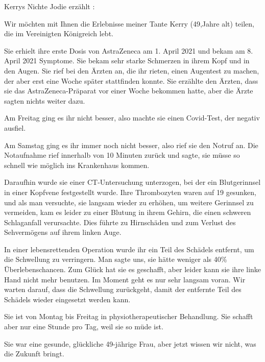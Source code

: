 Kerrys Nichte Jodie erzählt :

Wir möchten mit Ihnen die Erlebnisse meiner Tante Kerry (49,Jahre alt) teilen,
die im Vereinigten Königreich lebt.

Sie erhielt ihre erste Dosis von AstraZeneca am 1. April 2021 und bekam am
8. April 2021 Symptome. Sie bekam sehr starke Schmerzen in ihrem Kopf und in den
Augen. Sie rief bei den Ärzten an, die ihr rieten, einen Augentest zu machen,
der aber erst eine Woche später stattfinden konnte. Sie erzählte den Ärzten,
dass sie das AstraZeneca-Präparat vor einer Woche bekommen hatte, aber die Ärzte
sagten nichts weiter dazu.

Am Freitag ging es ihr nicht besser, also machte sie einen Covid-Test, der
negativ ausfiel.

Am Samstag ging es ihr immer noch nicht besser, also rief sie den Notruf an. Die
Notaufnahme rief innerhalb von 10 Minuten zurück und sagte, sie müsse so schnell
wie möglich ins Krankenhaus kommen.

Daraufhin wurde sie einer CT-Untersuchung unterzogen, bei der ein Blutgerinnsel
in einer Kopfvene festgestellt wurde. Ihre Thrombozyten waren auf 19 gesunken,
und als man versuchte, sie langsam wieder zu erhöhen, um weitere Gerinnsel zu
vermeiden, kam es leider zu einer Blutung in ihrem Gehirn, die einen schweren
Schlaganfall verursachte. Dies führte zu Hirnschäden und zum Verlust des
Sehvermögens auf ihrem linken Auge.

In einer lebensrettenden Operation wurde ihr ein Teil des Schädels entfernt, um
die Schwellung zu verringern. Man sagte uns, sie hätte weniger als 40\%
Überlebenschancen. Zum Glück hat sie es geschafft, aber leider kann sie ihre
linke Hand nicht mehr benutzen. Im Moment geht es nur sehr langsam voran. Wir
warten darauf, dass die Schwellung zurückgeht, damit der entfernte Teil des
Schädels wieder eingesetzt werden kann.

Sie ist von Montag bis Freitag in physiotherapeutischer Behandlung. Sie schafft
aber nur eine Stunde pro Tag, weil sie so müde ist.

Sie war eine gesunde, glückliche 49-jährige Frau, aber jetzt wissen wir nicht,
was die Zukunft bringt.
